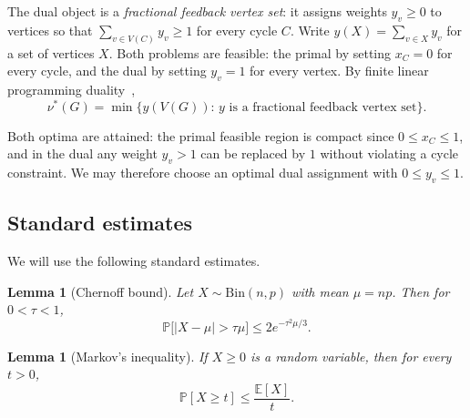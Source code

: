 \documentclass[10pt,a4paper]{article}
\newtheorem{lemma}[theorem]{Lemma}
\numberwithin{equation}{section}
\newcommand{\jbjcomment}[1]{\textcolor{blue}{JBJ: #1}}
\begin{document}
The dual object is a \emph{fractional feedback vertex set}: it assigns
weights $y_v\ge0$ to vertices so that
$\sum_{v\in V(C)}y_v\ge1$ for every cycle $C$.
Write $y(X)=\sum_{v\in X}y_v$ for a set of vertices $X$.
Both problems are feasible: the primal by setting $x_C=0$ for every
cycle, and the dual by setting $y_v=1$ for every vertex. By finite linear programming duality~\cite[Chapter~7]{schrijverTLIP1986},
\begin{equation}\label{eq:duality}
\nu^\ast(G)=\min\{y(V(G)):\,y\text{ is a fractional feedback vertex set}\}.
\end{equation} 

Both optima are attained: the primal feasible region is compact since
$0\le x_C\le 1$, and in the dual any weight $y_v>1$ can be replaced by
$1$ without violating a cycle constraint. We may therefore choose an
optimal dual assignment with $0\le y_v\le 1$.


\subsection{Standard estimates}\label{subsec:estimate}

We will use the following standard estimates. %


\begin{lemma}[Chernoff bound]\label{lem:chernoff}
Let $X\sim\mathrm{Bin}(n,p)$ with mean $\mu=np$. Then for $0<\tau<1$,
$$
\mathbb P\bigl[|X-\mu|>\tau\mu\bigr]\le2e^{-\tau^2\mu/3}.
$$
\end{lemma}


\begin{lemma}[Markov's inequality]\label{lem:markov}
If $X\ge0$ is a random variable, then for every $t>0$,
$$
\mathbb P[X\ge t]\le\frac{\mathbb E[X]}{t}.
$$
\end{lemma}


\end{document}

